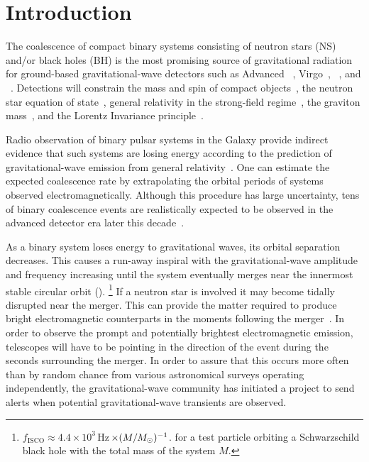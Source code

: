 \section{Introduction}
\label{sec:introduction}


%
The coalescence of compact binary systems consisting of neutron stars (NS)
and/or black holes (BH) is the most promising source of gravitational radiation
for ground-based gravitational-wave detectors such as Advanced
\LIGO~\cite{ALIGOWeb}, Virgo~\cite{AVirgoWeb}, \GEO~\cite{GEOWeb}, and
\LCGT~\cite{LCGTWeb}.  Detections will constrain the mass and spin of compact
objects~\cite{finn1993,Poisson:1995ef}, the neutron star equation of
state~\cite{flanagan:021502,Read:2009}, general relativity in the strong-field
regime~\cite{Will:2005va}, the graviton
mass~\cite{PhysRevD.80.044002,Keppel:2010qu}, and the Lorentz Invariance
principle~\cite{Ellis2006402}.  

Radio observation of binary pulsar systems in the Galaxy provide indirect
evidence that such systems are losing energy according to the prediction of
gravitational-wave emission from general
relativity~\cite{Taylor:1982,Abadie:2010p10836}.  One can estimate the expected
coalescence rate by extrapolating the orbital periods of systems observed
electromagnetically.  Although this procedure has large uncertainty, tens of
binary coalescence events are realistically expected to be observed in the
advanced detector era later this decade~\cite{Abadie:2010p10836}.

As a binary system loses energy to gravitational waves, its orbital separation
decreases. This causes a run-away inspiral with the gravitational-wave
amplitude and frequency increasing until the system eventually merges near the
innermost stable circular orbit (\ISCO).
%
\footnote{$f_\mathrm{ISCO} \approx 4.4\times 10^3\,$Hz$\,\times(M/M_{\odot})^{-1}$. 
for a test particle orbiting a Schwarzschild black hole with the total mass of
the system $M$.}
%
If a neutron star is involved it may become tidally disrupted near the merger.
This can provide the matter required to produce bright electromagnetic
counterparts in the moments following the merger~\cite{shibata:2007}.
 In order to observe the prompt and
potentially brightest electromagnetic emission, telescopes will have to be
pointing in the direction of the event during the seconds surrounding the
merger. In order to assure that this occurs more often than by random chance
from various astronomical surveys operating independently, the
gravitational-wave community has initiated a project to send alerts when
potential gravitational-wave transients are observed. 

